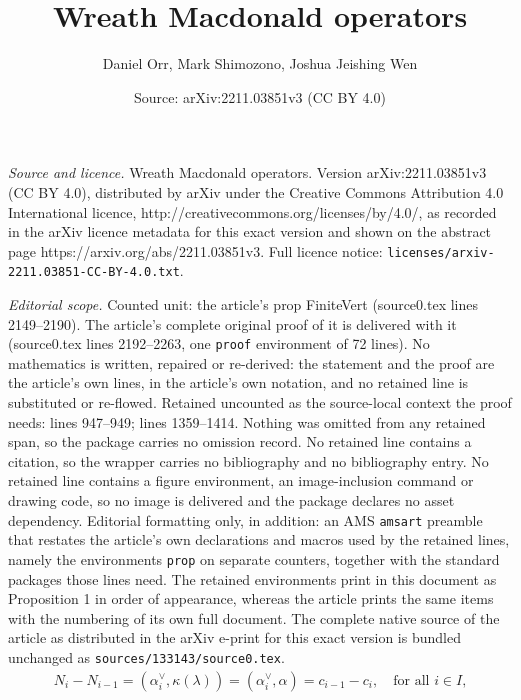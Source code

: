 \documentclass[10pt,a4paper]{amsart}
\title{Wreath Macdonald operators}
\author{Daniel Orr, Mark Shimozono, Joshua Jeishing Wen}
\date{Source: arXiv:2211.03851v3 (CC BY 4.0)}
\newcommand{\kb}{\kappa}
\begin{document}
\maketitle

\noindent\emph{Source and licence.} Wreath Macdonald operators. Version arXiv:2211.03851v3 (CC BY 4.0), distributed by arXiv under the Creative Commons Attribution 4.0 International licence, http://creativecommons.org/licenses/by/4.0/, as recorded in the arXiv licence metadata for this exact version and shown on the abstract page https://arxiv.org/abs/2211.03851v3. Full licence notice: \texttt{licenses/arxiv-2211.03851-CC-BY-4.0.txt}.\par\smallskip

\noindent\textit{Editorial scope.} Counted unit: the article's prop FiniteVert (source0.tex lines 2149--2190). The article's complete original proof of it is delivered with it (source0.tex lines 2192--2263, one \texttt{proof} environment of 72 lines). No mathematics is written, repaired or re-derived: the statement and the proof are the article's own lines, in the article's own notation, and no retained line is substituted or re-flowed.  Retained uncounted as the source-local context the proof needs: lines 947--949; lines 1359--1414.  Nothing was omitted from any retained span, so the package carries no omission record.  No retained line contains a citation, so the wrapper carries no bibliography and no bibliography entry.  No retained line contains a figure environment, an image-inclusion command or drawing code, so no image is delivered and the package declares no asset dependency.  Editorial formatting only, in addition: an AMS \texttt{amsart} preamble that restates the article's own declarations and macros used by the retained lines, namely the environments \texttt{prop} on separate counters, together with the standard packages those lines need.  The retained environments print in this document as Proposition 1 in order of appearance, whereas the article prints the same items with the numbering of its own full document.  The complete native source of the article as distributed in the arXiv e-print for this exact version is bundled unchanged as \texttt{sources/133143/source0.tex}.
\begin{align}\label{Compatibility}
N_{i}-N_{i-1}=(\alpha_i^\vee,\kb(\lambda))=(\alpha_i^\vee,\alpha)=c_{i-1}-c_{i},\quad \text{for all $i\in I$,}
\end{align}
\end{document}

